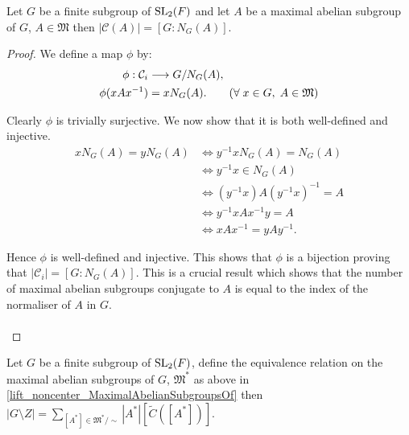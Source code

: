 \begin{footnotesize}
\begin{theorem}
\label{card_ConjClassOfSet_eq_index_normalizer}
\leanok

Let $G$ be a finite subgroup of $\operatorname{SL}_2(F)$ and let $A$ be a maximal abelian subgroup of $G$, 
$A \in \mathfrak{M}$ then $|\mathcal{C}(A)| = [G : N_G(A)]$.
\end{theorem}
\begin{proof}
  We define a map $\phi$ by:
  \begin{align*} \phi: \mathcal{C}_i &\longrightarrow G / N_G(A),
  \\ \phi(xAx^{-1}) &= xN_G(A). \tag{$\forall \; x \in G, \; A \in \mathfrak{M}$}
  \end{align*}
  
  Clearly $\phi$ is trivially surjective. We now show that it is both well-defined and injective.
  \begin{align*} xN_G(A) = yN_G(A) &\iff y^{-1}xN_G(A) = N_G(A) \\
  &\iff y^{-1}x \in N_G(A) \\
  &\iff (y^{-1}x)A(y^{-1}x)^{-1} = A \\
  &\iff y^{-1}xAx^{-1}y = A \\
  &\iff xAx^{-1} = yAy^{-1}.
  \end{align*}
  
  Hence $\phi$ is well-defined and injective. This shows that $\phi$ is a bijection proving that $|\mathcal{C}_i| = [G:N_G(A)]$. This is a crucial result which shows that the number of maximal abelian subgroups conjugate to $A$ is equal to the index of the normaliser of $A$ in $G$. \\
  \\
\end{proof}


\begin{theorem}
  \label{card_noncenter_fin_subgroup_eq_sum_card_noncenter_mul_index_normalizer}

Let $G$ be a finite subgroup of $\operatorname{SL}_2(F)$, define the equivalence relation on the maximal abelian subgroups of $G$, $\mathfrak{M}^*$ as above in \ref{lift_noncenter_MaximalAbelianSubgroupsOf}
then 
$|G \! \setminus  \! Z| = \sum_{[A^*] \in \mathfrak{M}^* / \sim} |A^*| [\tilde{C}([A^*])].$


\end{theorem}
\end{footnotesize}
